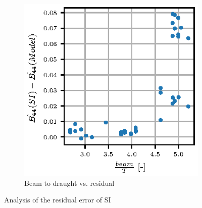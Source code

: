 \begin{figure}
\begin{subfigure}[b]{0.485\textwidth}
        \includegraphics[width=\textwidth]{figures/beam_T_residual.eps}
        \caption{Beam to draught vs. residual}
        \label{fig:beam_T_residual}
    \end{subfigure}
    
    \caption{Analysis of the residual error of SI}\label{fig:validation}
\end{figure}



